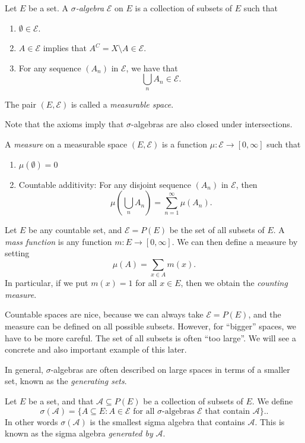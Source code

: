 \documentclass[a4paper]{article}
\begin{document}
\begin{defi}
  Let $E$ be a set. A \emph{$\sigma$-algebra} $\mathcal{E}$ on $E$ is a collection of subsets of $E$ such that
  \begin{enumerate}
    \item $\emptyset \in \mathcal{E}$.
    \item $A \in \mathcal{E}$ implies that $A^C = X \setminus A \in \mathcal{E}$.
    \item For any sequence $(A_n)$ in $\mathcal{E}$, we have that
      \[
        \bigcup_n A_n \in \mathcal{E}.
      \]
  \end{enumerate}
  The pair $(E, \mathcal{E})$ is called a \emph{measurable space}.
\end{defi}
Note that the axioms imply that $\sigma$-algebras are also closed under intersections.

\begin{defi}[Measure]
  A \emph{measure} on a measurable space $(E, \mathcal{E})$ is a function $\mu: \mathcal{E} \to [0, \infty]$ such that
  \begin{enumerate}
    \item $\mu(\emptyset) = 0$
    \item Countable additivity: For any disjoint sequence $(A_n)$ in $\mathcal{E}$, then
      \[
        \mu\left(\bigcup_n A_n\right) = \sum_{n = 1}^\infty \mu(A_n).
      \]
  \end{enumerate}
\end{defi}

\begin{eg}
  Let $E$ be any countable set, and $\mathcal{E} = P(E)$ be the set of all subsets of $E$. A \emph{mass function} is any function $m: E \to [0, \infty]$. We can then define a measure by setting
  \[
    \mu(A) = \sum_{x \in A} m(x).
  \]
  In particular, if we put $m(x) = 1$ for all $x \in E$, then we obtain the \emph{counting measure}.
\end{eg}

Countable spaces are nice, because we can always take $\mathcal{E} = P(E)$, and the measure can be defined on all possible subsets. However, for ``bigger'' spaces, we have to be more careful. The set of all subsets is often ``too large''. We will see a concrete and also important example of this later.

In general, $\sigma$-algebras are often described on large spaces in terms of a smaller set, known as the \emph{generating sets}.
\begin{defi}
  Let $E$ be a set, and that $\mathcal{A} \subseteq P(E)$ be a collection of subsets of $E$. We define
  \[
    \sigma(\mathcal{A}) = \{A \subseteq E: A \in \mathcal{E}\text{ for all $\sigma$-algebras $\mathcal{E}$ that contain $\mathcal{A}$}\}..
  \]
  In other words $\sigma(\mathcal{A})$ is the smallest sigma algebra that contains $\mathcal{A}$. This is known as the sigma algebra \emph{generated by} $\mathcal{A}$.
\end{defi}
\end{document}
